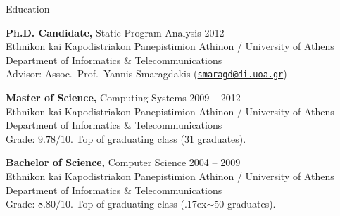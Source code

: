 \documentclass{resume}
\begin{document}
\newcommand{\mytilde}{\raise.17ex\hbox{$\scriptstyle\mathtt{\sim}$}}



\begin{rSection}{Education}

{\bf Ph.D. Candidate,} Static Program Analysis \hfill {2012 --} \\
Ethnikon kai Kapodistriakon Panepistimion Athinon / University of Athens \\
Department of Informatics \& Telecommunications \\
Advisor: Assoc.~Prof.~Yannis Smaragdakis
(\href{mailto:smaragd@di.uoa.gr}{\nolinkurl{smaragd@di.uoa.gr}})

{\bf Master of Science,} Computing Systems \hfill {2009 -- 2012} \\
Ethnikon kai Kapodistriakon Panepistimion Athinon / University of Athens \\
Department of Informatics \& Telecommunications \\
Grade: $9.78 / 10$. Top of graduating class (31 graduates).

{\bf Bachelor of Science,} Computer Science \hfill {2004 -- 2009}  \\
Ethnikon kai Kapodistriakon Panepistimion Athinon / University of Athens \\
Department of Informatics \& Telecommunications \\
Grade: $8.80 / 10$. Top of graduating class (\mytilde{}50 graduates).

\end{rSection}

\end{document}
